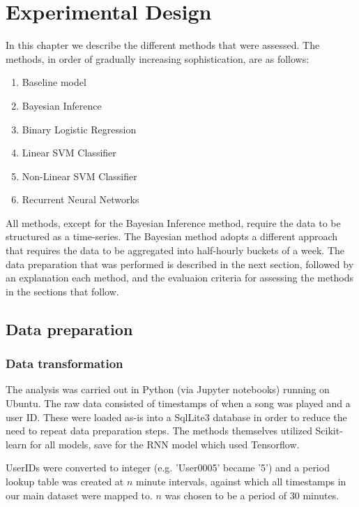 
\chapter{Experimental Design}

\label{Chapter4} %

In this chapter we describe the different methods that were assessed. The methods, in order of gradually increasing sophistication, are as follows:

\begin{enumerate}
    \item Baseline model
	\item Bayesian Inference
	\item Binary Logistic Regression
	\item Linear SVM Classifier
	\item Non-Linear SVM Classifier
	\item Recurrent Neural Networks
\end{enumerate}

All methods, except for the Bayesian Inference method, require the data to be structured as a time-series. The Bayesian method adopts a different approach that requires the data to be aggregated into half-hourly buckets of a week. The data preparation that was performed is described in the next section, followed by an explanation each method, and the evaluaion criteria for assessing the methods in the sections that follow.

\section{Data preparation}

\subsection{Data transformation}

The analysis was carried out in Python (via Jupyter notebooks) running on Ubuntu. The raw data consisted of timestamps of when a song was played and a user ID. These were loaded as-is into a SqlLite3 database in order to reduce the need to repeat data preparation steps. The methods themselves utilized Scikit-learn for all models, save for the RNN model which used Tensorflow.

UserIDs were converted to integer (e.g. 'User0005' became '5') and a period lookup table was created at $n$ minute intervals, against which all timestamps in our main dataset were mapped to. $n$ was chosen to be a period of 30 minutes.

